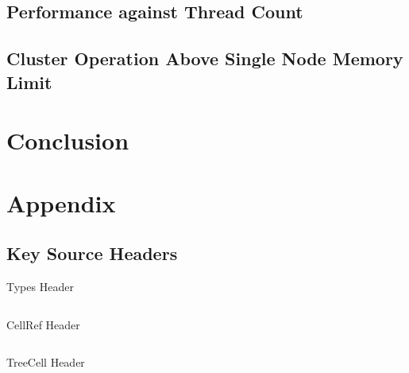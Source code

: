 \documentclass{IIBproject}
\numberwithin{figure}{section}
\begin{document}
    \subsection{Performance against Thread Count} %
        \label{sec:results-performance}



    \subsection{Cluster Operation Above Single Node Memory Limit}
        \label{sec:results-memory}




\section{Conclusion} %
    \label{sec:conclusions}



\printbibliography


\clearpage
\appendix

\section{Appendix} %
    \label{sec:appendix}

    \subsection{Key Source Headers} %
        \label{sec:appendix-headers}


        \begin{listing}[ht]
            \caption{Types Header}
            \label{src:types}
            \inputminted[mathescape,fontsize=\footnotesize]{cpp}{headers/types.h}
        \end{listing}

        \begin{listing}[ht]
            \caption{CellRef Header}
            \label{src:cellref}
            \inputminted[mathescape,fontsize=\footnotesize]{cpp}{headers/cellref.h}
        \end{listing}

        \begin{listing}[ht]
            \caption{TreeCell Header}
            \label{src:treecell}
            \inputminted[mathescape,fontsize=\footnotesize]{cpp}{headers/treecell.h}
        \end{listing}
\end{document}
